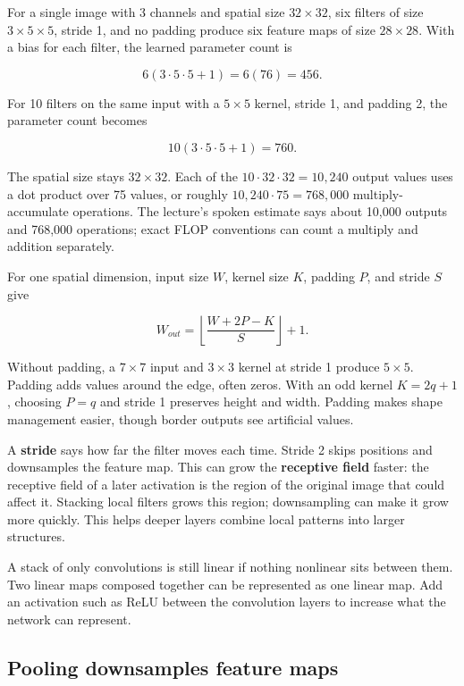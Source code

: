 For a single image with 3 channels and spatial size \(32\times32\), six filters of size \(3\times5\times5\), stride 1, and no padding produce six feature maps of size \(28\times28\). With a bias for each filter, the learned parameter count is

\[6(3\cdot5\cdot5+1)=6(76)=456.\]

For 10 filters on the same input with a \(5\times5\) kernel, stride 1, and padding 2, the parameter count becomes

\[10(3\cdot5\cdot5+1)=760.\]

The spatial size stays \(32\times32\). Each of the \(10\cdot32\cdot32=10{,}240\) output values uses a dot product over 75 values, or roughly \(10{,}240\cdot75=768{,}000\) multiply-accumulate operations. The lecture's spoken estimate says about 10,000 outputs and 768,000 operations; exact FLOP conventions can count a multiply and addition separately.

For one spatial dimension, input size \(W\), kernel size \(K\), padding \(P\), and stride \(S\) give

\[W_{out}=\left\lfloor\frac{W+2P-K}{S}\right\rfloor+1.\]

Without padding, a \(7\times7\) input and \(3\times3\) kernel at stride 1 produce \(5\times5\). Padding adds values around the edge, often zeros. With an odd kernel \(K=2q+1\), choosing \(P=q\) and stride 1 preserves height and width. Padding makes shape management easier, though border outputs see artificial values.

A \textbf{stride} says how far the filter moves each time. Stride 2 skips positions and downsamples the feature map. This can grow the \textbf{receptive field} faster: the receptive field of a later activation is the region of the original image that could affect it. Stacking local filters grows this region; downsampling can make it grow more quickly. This helps deeper layers combine local patterns into larger structures.

A stack of only convolutions is still linear if nothing nonlinear sits between them. Two linear maps composed together can be represented as one linear map. Add an activation such as ReLU between the convolution layers to increase what the network can represent.

\subsection{Pooling downsamples feature maps}\label{04-visual-computing-ii-ch031-pooling-downsamples-feature-maps}

